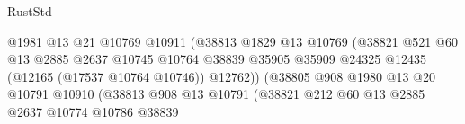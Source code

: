 \begin{lexlean}{RustStd}
\begin{coremodule}
                                                  @1981
                                                  @13
                                                  @21
                                                  @10769
                                                  @10911
                                                  (@38813
                                                    @1829
                                                    @13
                                                    @10769
                                                    (@38821
                                                      @521
                                                      @60
                                                      @13
                                                      @2885
                                                      @2637
                                                      @10745
                                                      @10764
                                                      @38839
                                                      @35905
                                                      @35909
                                                      @24325
                                                      @12435
                                                      (@12165 (@17537 @10764 @10746))
                                                      @12762))
                                                  (@38805
                                                    @908
                                                    @1980
                                                    @13
                                                    @20
                                                    @10791
                                                    @10910
                                                    (@38813
                                                      @908
                                                      @13
                                                      @10791
                                                      (@38821
                                                        @212
                                                        @60
                                                        @13
                                                        @2885
                                                        @2637
                                                        @10774
                                                        @10786
                                                        @38839

\end{coremodule}
\end{lexlean}

